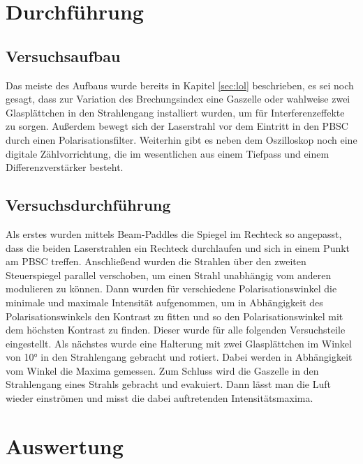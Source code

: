 \section{Durchführung}
  \subsection{Versuchsaufbau}
  Das meiste des Aufbaus wurde bereits in Kapitel \ref{sec:lol} beschrieben,
  es sei noch gesagt, dass zur Variation des Brechungsindex eine Gaszelle
  oder wahlweise zwei Glasplättchen in den Strahlengang installiert wurden, um
  für Interferenzeffekte zu sorgen. Außerdem bewegt sich der Laserstrahl vor dem Eintritt
  in den PBSC durch einen Polarisationsfilter. Weiterhin gibt es neben dem Oszilloskop
  noch eine digitale Zählvorrichtung, die im wesentlichen aus einem Tiefpass und einem
  Differenzverstärker besteht.
  \subsection{Versuchsdurchführung}
  Als erstes wurden mittels Beam-Paddles die Spiegel im Rechteck so angepasst,
  dass die beiden Laserstrahlen ein Rechteck durchlaufen und sich in einem
  Punkt am PBSC treffen. Anschließend wurden die Strahlen über den zweiten
  Steuerspiegel parallel verschoben, um einen Strahl unabhängig vom anderen modulieren
  zu können. Dann wurden für verschiedene Polarisationswinkel die
  minimale und maximale Intensität aufgenommen, um in Abhängigkeit des Polarisationswinkels
  den Kontrast zu fitten und so den Polarisationswinkel mit dem höchsten Kontrast
  zu finden. Dieser wurde für alle folgenden Versuchsteile eingestellt. Als nächstes
  wurde eine Halterung mit zwei Glasplättchen im Winkel von 10° in den Strahlengang gebracht
  und rotiert. Dabei werden in Abhängigkeit vom Winkel die Maxima gemessen. Zum
  Schluss wird die Gaszelle in den Strahlengang eines Strahls gebracht und evakuiert.
  Dann lässt man die Luft wieder einströmen und misst die dabei auftretenden
  Intensitätsmaxima.
\section{Auswertung}

